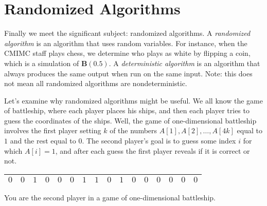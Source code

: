 \documentclass[12pt]{article}
\theoremstyle{plain}
\theoremstyle{definition}
\theoremstyle{remark}
\begin{document}
\section{Randomized Algorithms}

Finally we meet the significant subject: randomized algorithms. A \emph{randomized algorithm} is an algorithm that uses random variables. For instance, when the CMIMC staff plays chess, we determine who plays as white by flipping a coin, which is a simulation of $\textbf{B}(0.5)$. A \emph{deterministic algorithm} is an algorithm that always produces the same output when run on the same input. Note: this does not mean all randomized algorithms are nondeterministic.

Let's examine why randomized algorithms might be useful. We all know the game of battleship, where each player places his ships, and then each player tries to guess the coordinates of the ships. Well, the game of one-dimensional battleship involves the first player setting $k$ of the numbers $A[1],A[2],\dots,A[4k]$ equal to $1$ and the rest equal to $0$. The second player's goal is to guess some index $i$ for which $A[i]=1$, and after each guess the first player reveals if it is correct or not.

\begin{center}
\begin{tabular}{|c|c|c|c|c|c|c|c|c|c|c|c|c|c|c|c|}
\hline
$0$ & $0$ & $1$ & $0$ & $0$ & $0$ & $1$ & $1$ & $0$ & $1$ & $0$ & $0$ & $0$ & $0$ & $0$ & $0$ \\
\hline
\end{tabular}
\end{center}

You are the second player in a game of one-dimensional battleship.
\end{document}
